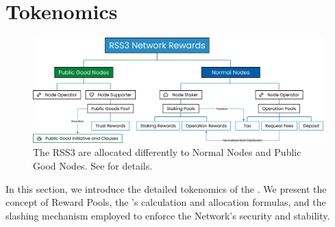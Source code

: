 \section{Tokenomics}
\label{sec:tokenomics}


{
    \begin{figure}[htb!]
        \centering
        \includegraphics[width=\linewidth]{figures/network-rewards.png}
        \caption{The RSS3  are allocated differently to Normal Nodes and Public Good Nodes.
            See  for details.}
        \label{fig:network-rewards}
    \end{figure}
}


In this section, we introduce the detailed tokenomics of the . We present the concept of Reward Pools, the 's calculation and allocation formulas, and the slashing mechanism employed to enforce the Network's security and stability.






